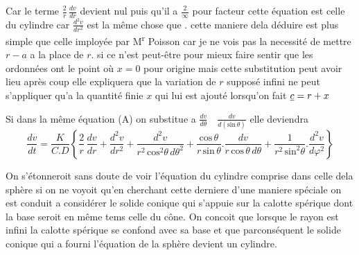 \documentclass[11pt,a4paper]{article}
\begin{document}
Car le terme $\frac{2}{r}\,\frac{dv}{dr}$ devient nul puis qu'il a $\frac{2}{\infty}$ pour facteur
cette équation est celle du cylindre car $\frac{d^{2}v}{dr^{2}}$ est la même
chose que . cette maniere dela déduire est plus simple
que celle imployée par M\textsuperscript{r} Poisson car je ne vois pas
la necessité de mettre $r - a$ a la place de $r$. si ce n'est
peut-être pour mieux faire sentir que les ordonnées ont
le point où $x = 0$ pour origine mais cette substitution
peut avoir lieu après coup elle expliquera que la variation
de $r$ supposé infini ne peut s'appliquer qu'a la 
quantité finie $x$ qui lui est  ajouté lorsqu'on
fait $\uncertain{c} = r + x$

Si dans la même équation (A) on  substitue a
$\frac{dv}{d\theta} \quad \frac{dv}{d(\text{sin}\,\theta)}$ elle deviendra
\[ \frac{dv}{dt} = \frac{K}{C.D}\left\{\frac{2}{r}\,\frac{dv}{dr} + \frac{d^{2}v}{dr^{2}} + \frac{d^{2}v}{r^{2}\,\text{cos}^{2}\theta\,d\theta^{2}} + \frac{\text{cos}\,\theta}{r\,\text{sin}\,\theta}.\frac{dv}{r\,\text{cos}\,\theta\,d\theta} + \frac{1}{r^{2}\,\text{sin}^{2}\theta}.\frac{d^{2}v}{d\varphi^{2}}\right\} \]

On s'étonneroit sans doute de voir l'équation du cylindre comprise
dans celle dela sphère si on ne voyoit qu'en cherchant cette
derniere d'une maniere spéciale on est conduit a considérer le solide
conique qui s'appuie sur la calotte spérique dont la base seroit
en même tems celle du cône. On concoit que lorsque le rayon
est infini la calotte spérique se confond avec sa base et
que parconséquent le solide conique qui a fourni l'équation
de la sphère devient un cylindre.
\end{document}
